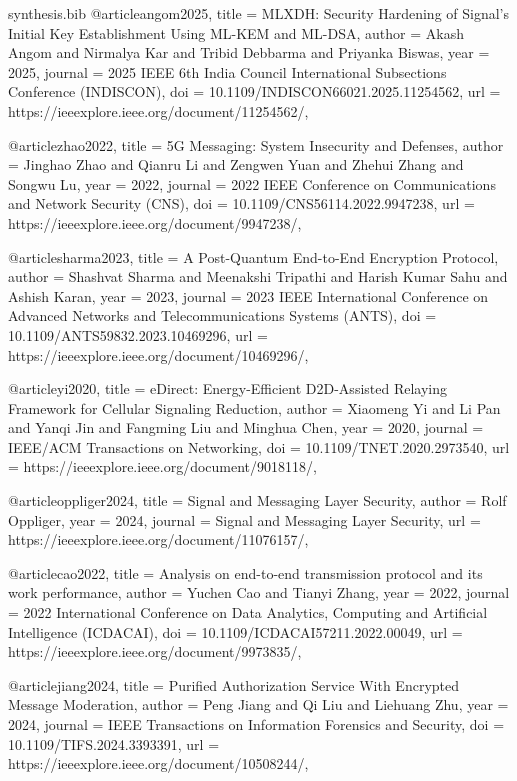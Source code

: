 \begin{filecontents*}{synthesis.bib}
@article{angom2025,
  title = {MLXDH: Security Hardening of Signal’s Initial Key Establishment Using ML-KEM and ML-DSA},
  author = {Akash Angom and Nirmalya Kar and Tribid Debbarma and Priyanka Biswas},
  year = {2025},
  journal = {2025 IEEE 6th India Council International Subsections Conference (INDISCON)},
  doi = {10.1109/INDISCON66021.2025.11254562},
  url = {https://ieeexplore.ieee.org/document/11254562/},
}

@article{zhao2022,
  title = {5G Messaging: System Insecurity and Defenses},
  author = {Jinghao Zhao and Qianru Li and Zengwen Yuan and Zhehui Zhang and Songwu Lu},
  year = {2022},
  journal = {2022 IEEE Conference on Communications and Network Security (CNS)},
  doi = {10.1109/CNS56114.2022.9947238},
  url = {https://ieeexplore.ieee.org/document/9947238/},
}

@article{sharma2023,
  title = {A Post-Quantum End-to-End Encryption Protocol},
  author = {Shashvat Sharma and Meenakshi Tripathi and Harish Kumar Sahu and Ashish Karan},
  year = {2023},
  journal = {2023 IEEE International Conference on Advanced Networks and Telecommunications Systems (ANTS)},
  doi = {10.1109/ANTS59832.2023.10469296},
  url = {https://ieeexplore.ieee.org/document/10469296/},
}

@article{yi2020,
  title = {eDirect: Energy-Efficient D2D-Assisted Relaying Framework for Cellular Signaling Reduction},
  author = {Xiaomeng Yi and Li Pan and Yanqi Jin and Fangming Liu and Minghua Chen},
  year = {2020},
  journal = {IEEE/ACM Transactions on Networking},
  doi = {10.1109/TNET.2020.2973540},
  url = {https://ieeexplore.ieee.org/document/9018118/},
}

@article{oppliger2024,
  title = {Signal and Messaging Layer Security},
  author = {Rolf Oppliger},
  year = {2024},
  journal = {Signal and Messaging Layer Security},
  url = {https://ieeexplore.ieee.org/document/11076157/},
}

@article{cao2022,
  title = {Analysis on end-to-end transmission protocol and its work performance},
  author = {Yuchen Cao and Tianyi Zhang},
  year = {2022},
  journal = {2022 International Conference on Data Analytics, Computing and Artificial Intelligence (ICDACAI)},
  doi = {10.1109/ICDACAI57211.2022.00049},
  url = {https://ieeexplore.ieee.org/document/9973835/},
}

@article{jiang2024,
  title = {Purified Authorization Service With Encrypted Message Moderation},
  author = {Peng Jiang and Qi Liu and Liehuang Zhu},
  year = {2024},
  journal = {IEEE Transactions on Information Forensics and Security},
  doi = {10.1109/TIFS.2024.3393391},
  url = {https://ieeexplore.ieee.org/document/10508244/},
}


\end{filecontents*}
